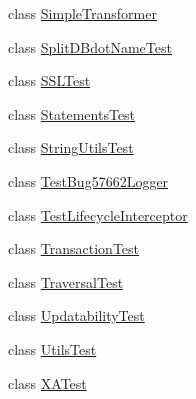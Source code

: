 \begin{DoxyCompactItemize}
\item 
class \mbox{\hyperlink{classtestsuite_1_1simple_1_1_simple_transformer}{Simple\+Transformer}}
\item 
class \mbox{\hyperlink{classtestsuite_1_1simple_1_1_split_d_bdot_name_test}{Split\+D\+Bdot\+Name\+Test}}
\item 
class \mbox{\hyperlink{classtestsuite_1_1simple_1_1_s_s_l_test}{S\+S\+L\+Test}}
\item 
class \mbox{\hyperlink{classtestsuite_1_1simple_1_1_statements_test}{Statements\+Test}}
\item 
class \mbox{\hyperlink{classtestsuite_1_1simple_1_1_string_utils_test}{String\+Utils\+Test}}
\item 
class \mbox{\hyperlink{classtestsuite_1_1simple_1_1_test_bug57662_logger}{Test\+Bug57662\+Logger}}
\item 
class \mbox{\hyperlink{classtestsuite_1_1simple_1_1_test_lifecycle_interceptor}{Test\+Lifecycle\+Interceptor}}
\item 
class \mbox{\hyperlink{classtestsuite_1_1simple_1_1_transaction_test}{Transaction\+Test}}
\item 
class \mbox{\hyperlink{classtestsuite_1_1simple_1_1_traversal_test}{Traversal\+Test}}
\item 
class \mbox{\hyperlink{classtestsuite_1_1simple_1_1_updatability_test}{Updatability\+Test}}
\item 
class \mbox{\hyperlink{classtestsuite_1_1simple_1_1_utils_test}{Utils\+Test}}
\item 
class \mbox{\hyperlink{classtestsuite_1_1simple_1_1_x_a_test}{X\+A\+Test}}
\end{DoxyCompactItemize}
